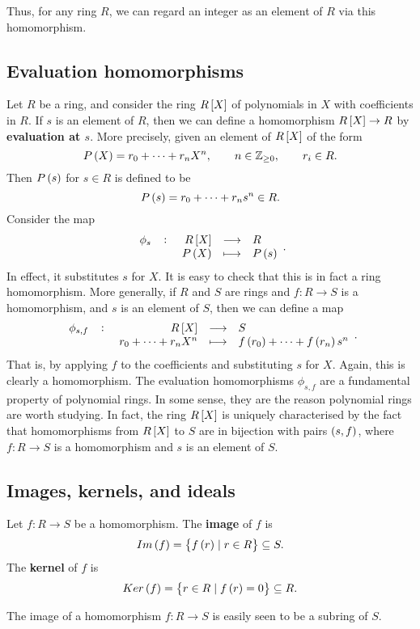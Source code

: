 Thus, for any ring $ R $, we can regard an integer as an element of $ R $ via this homomorphism.

\pagebreak

\subsection{Evaluation homomorphisms}

Let $ R $ be a ring, and consider the ring $ R\sbr{X} $ of polynomials in $ X $ with coefficients in $ R $. If $ s $ is an element of $ R $, then we can define a homomorphism $ R\sbr{X} \to R $ by \textbf{evaluation at $ s $}. More precisely, given an element of $ R\sbr{X} $ of the form
$$ P\br{X} = r_0 + \dots + r_nX^n, \qquad n \in \Z_{\ge 0}, \qquad r_i \in R. $$
Then $ P\br{s} $ for $ s \in R $ is defined to be
$$ P\br{s} = r_0 + \dots + r_ns^n \in R. $$
Consider the map
$$ \function[\phi_s]{R\sbr{X}}{R}{P\br{X}}{P\br{s}}. $$
In effect, it substitutes $ s $ for $ X $. It is easy to check that this is in fact a ring homomorphism. More generally, if $ R $ and $ S $ are rings and $ f : R \to S $ is a homomorphism, and $ s $ is an element of $ S $, then we can define a map
$$ \function[\phi_{s, f}]{R\sbr{X}}{S}{r_0 + \dots + r_nX^n}{f\br{r_0} + \dots + f\br{r_n}s^n}. $$
That is, by applying $ f $ to the coefficients and substituting $ s $ for $ X $. Again, this is clearly a homomorphism. The evaluation homomorphisms $ \phi_{s, f} $ are a fundamental property of polynomial rings. In some sense, they are the reason polynomial rings are worth studying. In fact, the ring $ R\sbr{X} $ is uniquely characterised by the fact that homomorphisms from $ R\sbr{X} $ to $ S $ are in bijection with pairs $ \br{s, f} $, where $ f : R \to S $ is a homomorphism and $ s $ is an element of $ S $.

\subsection{Images, kernels, and ideals}

\begin{definition}
Let $ f : R \to S $ be a homomorphism. The \textbf{image} of $ f $ is
$$ Im\br{f} = \cbr{f\br{r} \mid r \in R} \subseteq S. $$
The \textbf{kernel} of $ f $ is
$$ Ker\br{f} = \cbr{r \in R \mid f\br{r} = 0} \subseteq R. $$
\end{definition}

The image of a homomorphism $ f : R \to S $ is easily seen to be a subring of $ S $.

